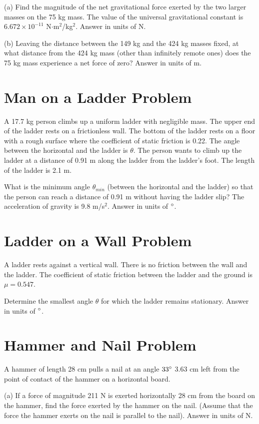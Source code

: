 \documentclass[../physics12.tex]{subfiles}
\begin{document}
(a) Find the magnitude of the net gravitational force exerted by the two larger masses on the 75 kg mass. The value of the universal gravitational constant is 
$6.672\times 10^{-11}$ N$\cdot$m$^2$/kg$^2$.
Answer in units of N.

(b) Leaving the distance between the 149 kg and the 424 kg masses fixed, at what distance from the 424 kg mass (other than infinitely remote ones) does the 75 kg mass experience a net force of zero?
Answer in units of m.

\section{Man on a Ladder Problem}
A 17.7 kg person climbs up a uniform ladder with negligible mass. The upper end of the ladder rests on a frictionless wall. 
The bottom of the ladder rests on a floor with a rough surface where the coefficient of static friction is 0.22.
The angle between the horizontal and the ladder is $\theta$. The person wants to climb up the ladder at a distance of 0.91 m along the ladder from the ladder's foot.
The length of the ladder is 2.1 m.

What is the minimum angle $\theta_{min}$ (between the horizontal and the ladder) so that the person can reach a distance of 0.91 m without having the ladder slip?
The acceleration of gravity is 9.8 m/s$^2$.
Answer in units of $\degree$.

\section{Ladder on a Wall Problem}
A ladder rests against a vertical wall. There is no friction between the wall and the ladder. 
The coefficient of static friction between the ladder and the ground is $\mu = 0.547$.

Determine the smallest angle $\theta$ for which the ladder remains stationary. 
Answer in units of $\degree$.

\section{Hammer and Nail Problem}
A hammer of length 28 cm pulls a nail at an angle $33\degree$ 3.63 cm left from the point of contact of the hammer on a horizontal board.

(a) If a force of magnitude 211 N is exerted horizontally 28 cm from the board on the hammer, find the force exerted by the hammer on the nail. (Assume that the force the hammer exerts on the nail is parallel to the nail).
Answer in units of N.
\end{document}
